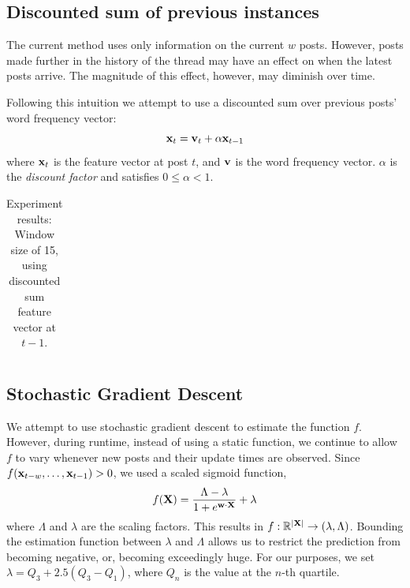 \documentclass[12 pt]{article}
\begin{document}
\subsection{Discounted sum of previous instances}

The current method uses only information on the current $w$ posts. However, posts made further in the history of the thread may have an effect on when the latest posts arrive. The magnitude of this effect, however, may diminish over time.

Following this intuition we attempt to use a discounted sum over previous posts' word frequency vector:
\[
	\mathbf{x}_t = \mathbf{v}_t + \alpha \mathbf{x}_{t-1}
\]
where $\mathbf{x}_t$ is the feature vector at post $t$, and $\mathbf{v}$ is the word frequency vector. $\alpha$ is the \emph{discount factor} and satisfies $0 \leq \alpha < 1$.


\begin{table}
	\footnotesize
	\begin{centering}
	\begin{tabular}{|l|c|c|c|c|c|c|c|c|}
	\hline
	
	\hline
	\end{tabular}
	\caption{Experiment results: Window size of 15, using discounted sum feature vector at $t-1$.}
	\label{exp_decay}
\end{centering}
\end{table}

\subsection{Stochastic Gradient Descent}

We attempt to use stochastic gradient descent to estimate the function $f$. However, during runtime, instead of using a static function, we continue to allow $f$ to vary whenever new posts and their update times are observed.
Since $f(\mathbf{x}_{t-w},\hdots,\mathbf{x}_{t-1}) > 0$, we used a scaled sigmoid function,
\[
	f(\mathbf{X}) = \frac{\Lambda-\lambda}{1 + e^{\mathbf{w} \cdot \mathbf{X}}} + \lambda
\]
where $\Lambda$ and $\lambda$ are the scaling factors. This results in $f: \mathbb{R}^{|\mathbf{X}|}  \rightarrow (\lambda,\Lambda)$. Bounding the estimation function between $\lambda$ and $\Lambda$ allows us to restrict the prediction from becoming negative, or, becoming exceedingly huge. For our purposes, we set $\lambda = Q_3 + 2.5(Q_{3} - Q_{1})$, where $Q_n$ is the value at the $n$-th quartile. 
\end{document}
